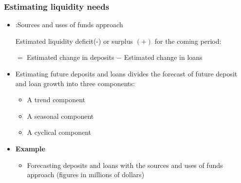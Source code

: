   \subsubsection*{Estimating liquidity needs}

  \begin{itemize}
    \item :Sources and uses of funds approach
    
    Estimated liquidity deficit(-) or surplus \((+)\) for the coming period:
    
    \(=\) Estimated change in deposits \(-\) Estimated change in loans
    \item Estimating future deposits and loans divides the forecast of future deposit and loan growth into three components:
      \begin{itemize}
        \item A trend component
        \item A seasonal component
        \item A cyclical component
      \end{itemize}
    \item \textbf{Example}
      \begin{itemize}
        \item Forecasting deposits and loans with the sources and uses of funds approach (figures in millions of dollars)
          \begin{center}
          \end{center}

\end{itemize}
\end{itemize}
